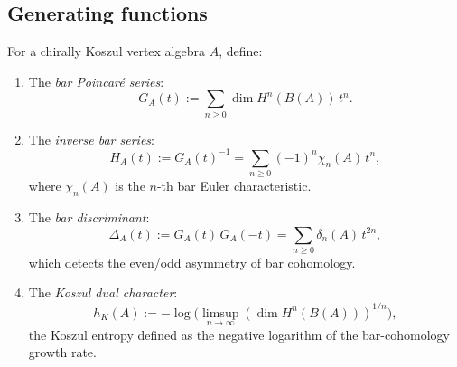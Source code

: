 \subsection{Generating functions}

\begin{definition}
For a chirally Koszul vertex algebra $A$, define:
\begin{enumerate}[leftmargin=2.4em]
\item The \emph{bar Poincar\'e series}:
\begin{equation}%
G_A(t) := \sum_{n \ge 0} \dim H^n(B(A))\, t^n.
\end{equation}

\item The \emph{inverse bar series}:
\begin{equation}%
H_A(t) := G_A(t)^{-1} = \sum_{n \ge 0} (-1)^n \chi_n(A)\, t^n,
\end{equation}
where $\chi_n(A)$ is the $n$-th bar Euler characteristic.

\item The \emph{bar discriminant}:
\begin{equation}%
\Delta_A(t) := G_A(t)\,G_A(-t) = \sum_{n \ge 0} \delta_n(A)\, t^{2n},
\end{equation}
which detects the even/odd asymmetry of bar cohomology.

\item The \emph{Koszul dual character}:
\begin{equation}%
h_K(A) := -\log\bigl(\limsup_{n\to\infty}(\dim H^n(B(A)))^{1/n}\bigr),
\end{equation}
the Koszul entropy defined as the negative logarithm of the
bar-cohomology growth rate.
\end{enumerate}
\end{definition}

